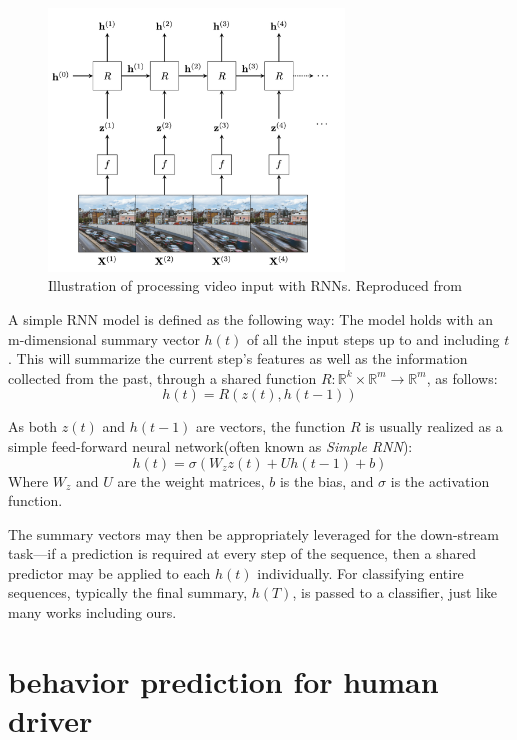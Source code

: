     \begin{figure}[h]
        \centering
        \includegraphics[width=0.7\textwidth]{figures/02_RNN.png}
        \caption{Illustration of processing video input with RNNs. Reproduced from \cite{10.48550/arxiv.2104.13478}}
        \label{fig:RNN}
    \end{figure}

    A simple RNN model is defined as the following way: The model holds with an m-dimensional summary vector $h(t)$ of all the input steps up to and including $t$. This will summarize the current step's features as well as the information collected from the past, through a shared function $R: \mathbb{R} ^k \times \mathbb{R} ^m \rightarrow \mathbb{R} ^m$, as follows:
    \[
        h(t) = R(z(t), h(t-1))
    \]

    As both $z(t)$ and $h(t-1)$ are vectors, the function $R$ is usually realized as a simple feed-forward neural network(often known as \textit{Simple RNN}\cite{elman1990finding,jordan1997serial}):
    \[
        h(t) = \sigma(W_z z(t) + U h(t-1) + b)
    \]
    Where $W_z$ and $U$ are the weight matrices, $b$ is the bias, and $\sigma$ is the activation function. 

    The summary vectors may then be appropriately leveraged for the down-stream task—if a prediction is required at every step of the sequence, then a shared predictor may be applied to each $h(t)$ individually. For classifying entire sequences, typically the final summary, $h(T)$, is passed to a classifier, just like many works including ours.


    

\section{behavior prediction for human driver}

